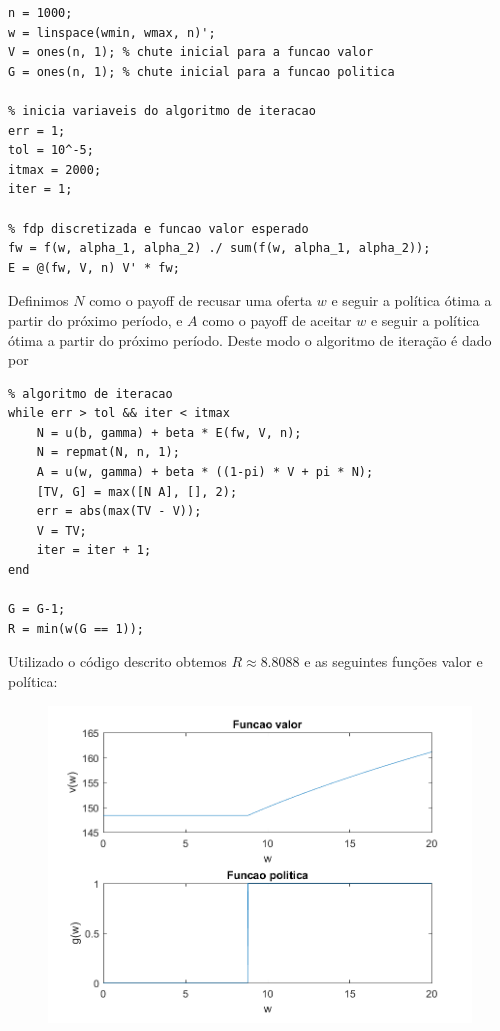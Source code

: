 \documentclass{article}
\begin{document}
\newpage
\begin{lstlisting}
n = 1000;
w = linspace(wmin, wmax, n)';
V = ones(n, 1); % chute inicial para a funcao valor
G = ones(n, 1); % chute inicial para a funcao politica

% inicia variaveis do algoritmo de iteracao
err = 1;
tol = 10^-5;
itmax = 2000;
iter = 1;

% fdp discretizada e funcao valor esperado
fw = f(w, alpha_1, alpha_2) ./ sum(f(w, alpha_1, alpha_2));
E = @(fw, V, n) V' * fw; 
\end{lstlisting}

Definimos $N$ como o payoff de recusar uma oferta $w$ e seguir a política ótima a partir do próximo período, 
e $A$ como o payoff de aceitar $w$ e seguir a política ótima a partir do próximo período. 
Deste modo o algoritmo de iteração é dado por

\begin{lstlisting}
% algoritmo de iteracao
while err > tol && iter < itmax
    N = u(b, gamma) + beta * E(fw, V, n);
    N = repmat(N, n, 1);
    A = u(w, gamma) + beta * ((1-pi) * V + pi * N);
    [TV, G] = max([N A], [], 2);
    err = abs(max(TV - V));
    V = TV;
    iter = iter + 1;
end

G = G-1;
R = min(w(G == 1));
\end{lstlisting}

Utilizado o código descrito obtemos $R \approx 8.8088$ e as seguintes funções valor e política:

\begin{figure}[!h]
  \includegraphics{ex1_1.png}
\end{figure}
\end{document}
